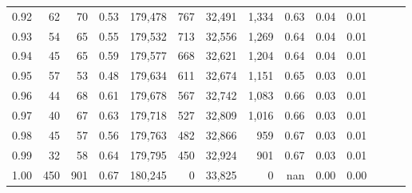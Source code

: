 \begin{tabular}{rrrrrrrrrrrrrr}
0.92 &     62 &   70 &  0.53 &  179,478 &      767 &  32,491 &   1,334 &  0.63 &  0.04 &      0.01 \\
0.93 &     54 &   65 &  0.55 &  179,532 &      713 &  32,556 &   1,269 &  0.64 &  0.04 &      0.01 \\
0.94 &     45 &   65 &  0.59 &  179,577 &      668 &  32,621 &   1,204 &  0.64 &  0.04 &      0.01 \\
0.95 &     57 &   53 &  0.48 &  179,634 &      611 &  32,674 &   1,151 &  0.65 &  0.03 &      0.01 \\
0.96 &     44 &   68 &  0.61 &  179,678 &      567 &  32,742 &   1,083 &  0.66 &  0.03 &      0.01 \\
0.97 &     40 &   67 &  0.63 &  179,718 &      527 &  32,809 &   1,016 &  0.66 &  0.03 &      0.01 \\
0.98 &     45 &   57 &  0.56 &  179,763 &      482 &  32,866 &     959 &  0.67 &  0.03 &      0.01 \\
0.99 &     32 &   58 &  0.64 &  179,795 &      450 &  32,924 &     901 &  0.67 &  0.03 &      0.01 \\
1.00 &    450 &  901 &  0.67 &  180,245 &        0 &  33,825 &       0 &   nan &  0.00 &      0.00 \\
\bottomrule
\end{tabular}
